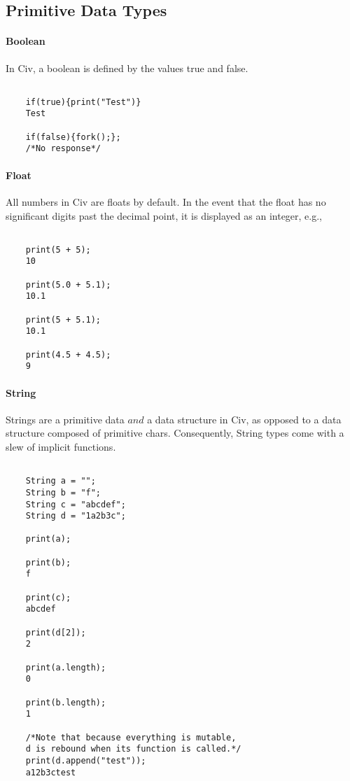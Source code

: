 \documentclass[a4paper]{article}
\begin{document}
\subsection{Primitive Data Types}
\paragraph{Boolean}
In Civ, a boolean is defined by the values {\selectfont true} and {\selectfont false}. 

{\selectfont
\begin{lstlisting} 
    
	if(true){print("Test")}
	Test
        
	if(false){fork();};
	/*No response*/

\end{lstlisting}
}

\paragraph{Float}
All numbers in Civ are floats by default. In the event that the float has no significant digits past the decimal point, it is displayed as an integer, e.g.,

{\selectfont
\begin{lstlisting} 

	print(5 + 5);
	10
    
	print(5.0 + 5.1);
	10.1
    
	print(5 + 5.1);
	10.1
    
	print(4.5 + 4.5);
	9

\end{lstlisting}
}

\paragraph{String}
Strings are a primitive data $and$ a data structure in Civ, as opposed to a data structure composed of primitive chars. Consequently, String types come with a slew of implicit functions.

{\selectfont
\begin{lstlisting}

	String a = "";
	String b = "f";
	String c = "abcdef";
	String d = "1a2b3c";
    
	print(a);
    
	print(b);
	f
    
	print(c);
	abcdef
    
	print(d[2]);
	2
    
	print(a.length);
	0
    
	print(b.length);
	1
    
	/*Note that because everything is mutable,
	d is rebound when its function is called.*/
	print(d.append("test"));
	a12b3ctest
	
\end{lstlisting}
}
\end{document}

